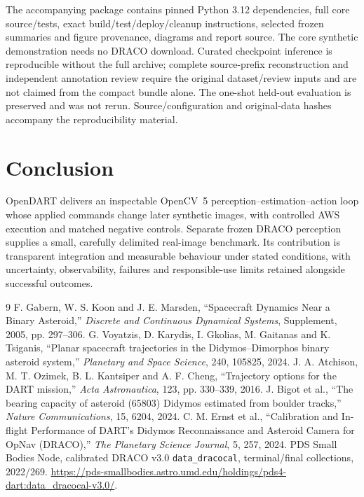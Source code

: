 \documentclass[11pt,a4paper]{article}
\begin{document}
The accompanying package contains pinned Python 3.12 dependencies, full core source/tests, exact build/test/deploy/cleanup instructions, selected frozen summaries and figure provenance, diagrams and report source. The core synthetic demonstration needs no DRACO download. Curated checkpoint inference is reproducible without the full archive; complete source-prefix reconstruction and independent annotation review require the original dataset/review inputs and are not claimed from the compact bundle alone. The one-shot held-out evaluation is preserved and was not rerun. Source/configuration and original-data hashes accompany the reproducibility material.

\section{Conclusion}
OpenDART delivers an inspectable OpenCV~5 perception--estimation--action loop whose applied commands change later synthetic images, with controlled AWS execution and matched negative controls. Separate frozen DRACO perception supplies a small, carefully delimited real-image benchmark. Its contribution is transparent integration and measurable behaviour under stated conditions, with uncertainty, observability, failures and responsible-use limits retained alongside successful outcomes.
\begin{thebibliography}{9}
 F. Gabern, W. S. Koon and J. E. Marsden, ``Spacecraft Dynamics Near a Binary Asteroid,'' \emph{Discrete and Continuous Dynamical Systems}, Supplement, 2005, pp. 297--306.
 G. Voyatzis, D. Karydis, I. Gkolias, M. Gaitanas and K. Tsiganis, ``Planar spacecraft trajectories in the Didymos--Dimorphos binary asteroid system,'' \emph{Planetary and Space Science}, 240, 105825, 2024.
 J. A. Atchison, M. T. Ozimek, B. L. Kantsiper and A. F. Cheng, ``Trajectory options for the DART mission,'' \emph{Acta Astronautica}, 123, pp. 330--339, 2016.
 J. Bigot et al., ``The bearing capacity of asteroid (65803) Didymos estimated from boulder tracks,'' \emph{Nature Communications}, 15, 6204, 2024.
 C. M. Ernst et al., ``Calibration and In-flight Performance of DART's Didymos Reconnaissance and Asteroid Camera for OpNav (DRACO),'' \emph{The Planetary Science Journal}, 5, 257, 2024.
 PDS Small Bodies Node, calibrated DRACO v3.0 \texttt{data\_dracocal}, terminal/final collections, 2022/269. \url{https://pds-smallbodies.astro.umd.edu/holdings/pds4-dart:data_dracocal-v3.0/}.
\end{thebibliography}
\end{document}
